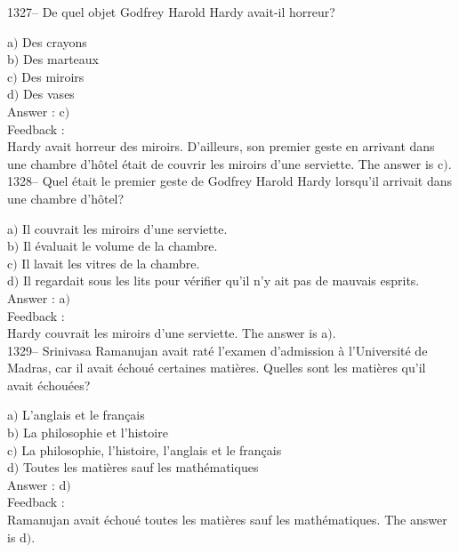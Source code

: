 \documentclass[letterpaper, 12pt]{article}
\begin{document}
1327-- De quel objet Godfrey Harold Hardy avait-il horreur?

a$)$ Des crayons \\
b$)$ Des marteaux \\
c$)$ Des miroirs \\
d$)$ Des vases\\

Answer : c$)$\\

Feedback : \\
Hardy avait horreur des miroirs. D'ailleurs, son premier geste en
arrivant dans une chambre d'h\^otel \'etait de couvrir les miroirs
d'une serviette.
The answer is  c$)$.\\

1328-- Quel \'etait le premier geste de Godfrey Harold Hardy
lorsqu'il arrivait dans une chambre d'h\^otel?

a$)$ Il couvrait les miroirs d'une serviette. \\
b$)$ Il \'evaluait le volume de la chambre. \\
c$)$ Il lavait les vitres de la chambre. \\
d$)$ Il regardait sous les lits pour v\'erifier qu'il n'y ait pas de mauvais
esprits.\\

Answer : a$)$\\

Feedback : \\
Hardy couvrait les miroirs d'une serviette.
The answer is  a$)$.\\

1329-- Srinivasa Ramanujan avait rat\'e l'examen d'admission \`a
l'Universit\'e de Madras, car il avait \'echou\'e certaines
mati\`eres. Quelles sont les mati\`eres qu'il avait \'echou\'ees?

a$)$ L'anglais et le fran\c cais \\
b$)$ La philosophie et l'histoire \\
c$)$ La philosophie, l'histoire, l'anglais et le fran\c cais \\
d$)$ Toutes les mati\`eres sauf les math\'ematiques\\

Answer : d$)$\\

Feedback : \\
Ramanujan avait \'echou\'e toutes les mati\`eres sauf les
math\'ematiques.
The answer is  d$)$.\\
\end{document}
